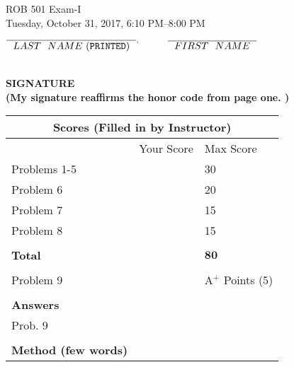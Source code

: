 \documentclass[letterpaper]{article}
\begin{document}
\vspace*{.1in}
\begin{center}
\LARGE
ROB 501 Exam-I \\
\large
Tuesday, October 31, 2017, 6:10 PM--8:00 PM
\end{center}

\vspace*{1in}

\begin{center}
$\overline{\mathrm ~~LAST~~NAME~ ({\tt PRINTED})~~}^, \hspace*{.4in} \overline{\mathrm ~~FIRST~~NAME~~}$ \\

\vspace*{1cm}


\vspace*{2cm}


\end{center}

\vspace*{1in}
\begin{flushright}
\underline{\hspace*{1.in}} \\
{\bf SIGNATURE \\
(My signature reaffirms the honor code from page one. )}
\end{flushright}

\vspace*{1 in}

\begin{center}
\LARGE
\begin{tabular}{|p{1.5in}|p{2.6in}|p{1.5in}|}
\hline
\multicolumn{3}{|c|}{\textbf{Scores (Filled in by Instructor)}}\\
\hline
 & Your Score& Max Score \\
\hline
Problems 1-5 &  &   30\\
\hline
Problem 6 &  &   20\\
\hline
Problem 7 &  &   15\\
\hline
Problem 8 &  &   15\\
\hline
& & \\
\hline
\textbf{Total} &  &   $\mathbf{80}$\\
\hline
& & \\
\hline
Problem 9 &  &   A$^+$ Points (5)\\
\hline
& & \\
\hline
\textbf{Answers}  &   &   \\
 Prob. 9 & \makebox[11cm][l]{$M^{-1}=\begin{bmatrix}\qquad & \qquad& \qquad \\ \qquad & \qquad & \qquad \\ \qquad & \qquad& \qquad \end{bmatrix}$} &  \\
 & & \\
 \hline
 \textbf{Method (few words)}  &   &   \\
\hline
\end{tabular}
\end{center}
\end{document}
